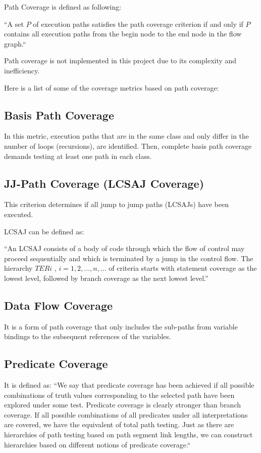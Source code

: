 \documentclass[12pt,a4paper]{report}
\begin{document}
Path Coverage is defined as following:

“A set $P$ of execution paths satisfies the path coverage criterion if and only if $P$ contains all execution paths from the begin node to the end node in the flow graph.“\cite{Zhu:1997:SUT:267580.267590}

Path coverage is not implemented in this project due to its complexity and inefficiency. 

Here is a list of some of the coverage metrics based on path coverage:
\subsection{Basis Path Coverage}
In this metric, execution paths that are in the same class and only differ in the number of loops (recursions), are identified. Then, complete basis path coverage demands testing at least one path in each class.

\subsection{JJ-Path Coverage (LCSAJ Coverage)}
This criterion determines if all jump to jump paths (LCSAJs) have been executed. 

LCSAJ can be defined as:

“An LCSAJ consists of a body of code through which the flow of control may proceed sequentially and which is terminated by a jump in the control flow. The hierarchy $TERi$ , $i = 1, 2, . . . ,n, . . .$ of criteria starts with statement coverage as the lowest level, followed by branch coverage as the next lowest level.”\cite{Zhu:1997:SUT:267580.267590}

\subsection{Data Flow Coverage}
It is a form of path coverage that only includes the sub-paths from variable bindings to the subsequent references of the variables.
 
\subsection{Predicate Coverage}
It is defined as:
“We say that predicate coverage has been achieved if all possible combinations of truth values corresponding to the selected path have been explored under some test. Predicate coverage is clearly stronger than branch coverage. If all possible combinations of all predicates under all interpretations are covered, we have the equivalent of total path testing. Just as there are hierarchies of path testing based on path segment link lengths, we can construct hierarchies based on different notions of predicate coverage.“\cite{beizer2002software}
\end{document}
